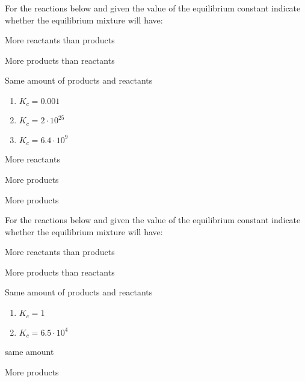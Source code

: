 \documentclass[main.tex]{subfiles}
\begin{document}
\begin{multicols*}{2}
\begin{question}[ID=\the\value{numA}]
For the reactions below and given the value of the equilibrium constant indicate whether the equilibrium mixture will have:
\begin{inparaenum}[(a)]	
\item More reactants than products
\item More  products than reactants
\item Same amount of  products and reactants
 \end{inparaenum}
 \begin{enumerate}[label=(\alph*)]	
\item   {}\hfill $K_{c}=0.001$ %
\item {}\hfill$K_{c}=2\cdot 10^{25}$	%
\item {}\hfill $K_{c}=6.4\cdot 10^{9}$	%

 \end{enumerate}
\end{question}
\begin{solution}
\begin{inparaenum}[(a)]
\item    More reactants
\item  More products
\item  More products
 \end{inparaenum}
\hspace{0.1cm}\end{solution}%


\begin{question}[ID=\the\value{numA}]
For the reactions below and given the value of the equilibrium constant indicate whether the equilibrium mixture will have:
\begin{inparaenum}[(a)]	
\item More reactants than products
\item More  products than reactants
\item Same amount of  products and reactants
 \end{inparaenum}
 \begin{enumerate}[label=(\alph*)]	
\item {}\hfill$K_{c}=1$	%
\item	{}\hfill $K_{c}=6.5\cdot 10^{4}$ %
 \end{enumerate}
\end{question}
\begin{solution}
\begin{inparaenum}[(a)]
\item  same amount
\item	  More products
 \end{inparaenum}
\hspace{0.1cm}\end{solution}%



\end{multicols*}
\end{document}
